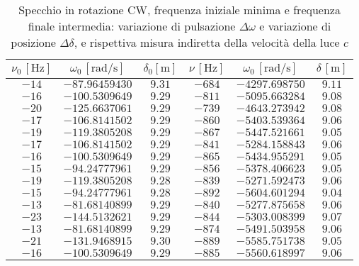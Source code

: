 \documentclass[]{article}
\begin{document}
\begin {table}
\centering

 \begin{tabular}{||c|c|c||c|c|c||}
    \hline
    $\nu_0\, [\text{Hz}] $ & $\omega_0\, [\text{rad/s}] $ & $\delta_0 [\text{m}] $ & $\nu\, [\text{Hz}] $ & $\omega_0\, [\text{rad/s}] $ & $\delta\, [\text{m}] $ \\
    \hline\hline
    $-14$ & $-87.96459430 $ & $9.31$ & $-684$ & $-4297.698750$ & $9.11$\\\hline
    $-16$ & $-100.5309649 $ & $9.29$ & $-811$ & $-5095.663284$ & $9.08$\\\hline
    $-20$ & $-125.6637061 $ & $9.29$ & $-739$ & $-4643.273942$ & $9.08$\\\hline
    $-17$ & $-106.8141502 $ & $9.29$ & $-860$ & $-5403.539364$ & $9.06$\\\hline
    $-19$ & $-119.3805208 $ & $9.29$ & $-867$ & $-5447.521661$ & $9.05$\\\hline
    $-17$ & $-106.8141502 $ & $9.29$ & $-841$ & $-5284.158843$ & $9.06$\\\hline
    $-16$ & $-100.5309649 $ & $9.29$ & $-865$ & $-5434.955291$ & $9.05$\\\hline
    $-15$ & $-94.24777961 $ & $9.29$ & $-856$ & $-5378.406623$ & $9.05$\\\hline
    $-19$ & $-119.3805208 $ & $9.28$ & $-839$ & $-5271.592473$ & $9.06$\\\hline
    $-15$ & $-94.24777961 $ & $9.28$ & $-892$ & $-5604.601294$ & $9.04$\\\hline
    $-13$ & $-81.68140899 $ & $9.29$ & $-840$ & $-5277.875658$ & $9.06$\\\hline
    $-23$ & $-144.5132621 $ & $9.29$ & $-844$ & $-5303.008399$ & $9.07$\\\hline
    $-13$ & $-81.68140899 $ & $9.29$ & $-874$ & $-5491.503958$ & $9.06$\\\hline
    $-21$ & $-131.9468915 $ & $9.30$ & $-889$ & $-5585.751738$ & $9.05$\\\hline
    $-16$ & $-100.5309649 $ & $9.29$ & $-885$ & $-5560.618997$ & $9.06$\\\hline

    \end{tabular}
\caption{Specchio in rotazione CW, frequenza iniziale minima e frequenza finale intermedia: variazione di pulsazione $\Delta\omega$ e variazione di posizione $\Delta\delta$, e rispettiva misura indiretta della velocità della luce $c$}

\label{CW_min_mid}
\end{table}
\end{document}
